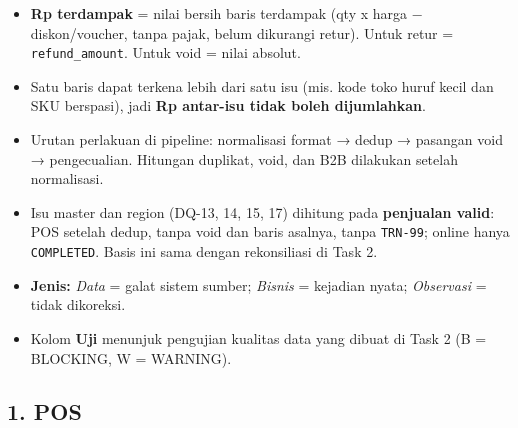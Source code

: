 \documentclass[10pt,a4paper]{article}
\providecommand{\tightlist}{\setlength{\itemsep}{1pt}\setlength{\parskip}{0pt}}
\begin{document}
\begin{itemize}
\tightlist
\item
  \textbf{Rp terdampak} = nilai bersih baris terdampak (qty x harga − diskon/voucher, tanpa pajak, belum dikurangi retur). Untuk retur = \texttt{refund\_\allowbreak{}amount}. Untuk void = nilai absolut.
\item
  Satu baris dapat terkena lebih dari satu isu (mis. kode toko huruf kecil dan SKU berspasi), jadi \textbf{Rp antar-isu tidak boleh dijumlahkan}.
\item
  Urutan perlakuan di pipeline: normalisasi format → dedup → pasangan void → pengecualian. Hitungan duplikat, void, dan B2B dilakukan setelah normalisasi.
\item
  Isu master dan region (DQ-13, 14, 15, 17) dihitung pada \textbf{penjualan valid}: POS setelah dedup, tanpa void dan baris asalnya, tanpa \texttt{TRN-99}; online hanya \texttt{COMPLETED}. Basis ini sama dengan rekonsiliasi di Task 2.
\item
  \textbf{Jenis:} \emph{Data} = galat sistem sumber; \emph{Bisnis} = kejadian nyata; \emph{Observasi} = tidak dikoreksi.
\item
  Kolom \textbf{Uji} menunjuk pengujian kualitas data yang dibuat di Task 2 (B = BLOCKING, W = WARNING).
\end{itemize}

\subsection{1. POS}\label{pos}
\end{document}
